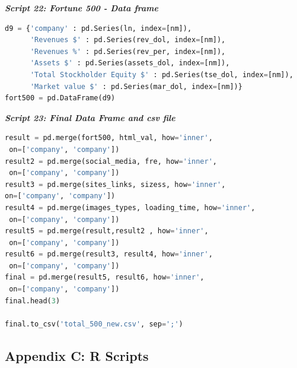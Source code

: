 \documentclass{article}
\begin{document}
\begin{center}
\textit{\textbf{Script 22: Fortune 500 - Data frame}} \label{p22}
\end{center}
\begin{lstlisting}[language=Python]  
d9 = {'company' : pd.Series(ln, index=[nm]),
      'Revenues $' : pd.Series(rev_dol, index=[nm]),
      'Revenues %' : pd.Series(rev_per, index=[nm]),
      'Assets $' : pd.Series(assets_dol, index=[nm]),
      'Total Stockholder Equity $' : pd.Series(tse_dol, index=[nm]),
      'Market value $' : pd.Series(mar_dol, index=[nm])}
fort500 = pd.DataFrame(d9)    
\end{lstlisting}

\begin{center}
\textit{\textbf{Script 23: Final Data Frame and csv file}}\label{p23}
\end{center}
\begin{lstlisting}[language=Python]
result = pd.merge(fort500, html_val, how='inner',
 on=['company', 'company'])
result2 = pd.merge(social_media, fre, how='inner',
 on=['company', 'company'])
result3 = pd.merge(sites_links, sizess, how='inner', 
on=['company', 'company'])
result4 = pd.merge(images_types, loading_time, how='inner',
 on=['company', 'company'])
result5 = pd.merge(result,result2 , how='inner',
 on=['company', 'company'])
result6 = pd.merge(result3, result4, how='inner',
 on=['company', 'company'])
final = pd.merge(result5, result6, how='inner',
 on=['company', 'company'])
final.head(3)

final.to_csv('total_500_new.csv', sep=';')
\end{lstlisting}

\newpage
\subsection{Appendix C: R Scripts} \label{appR}
\end{document}
